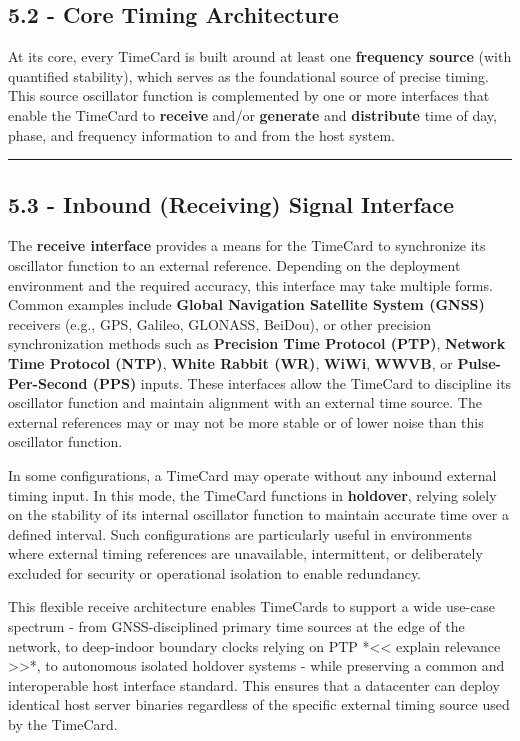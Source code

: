 \subsection{5.2 - Core Timing
Architecture}\label{core-timing-architecture}

At its core, every TimeCard is built around at least one
\textbf{frequency source} (with quantified stability), which serves as
the foundational source of precise timing. This source oscillator
function is complemented by one or more interfaces that enable the
TimeCard to \textbf{receive} and/or \textbf{generate} and
\textbf{distribute} time of day, phase, and frequency information to and
from the host system.

\begin{center}\rule{0.5\linewidth}{0.5pt}\end{center}

\subsection{5.3 - Inbound (Receiving) Signal
Interface}\label{inbound-receiving-signal-interface}

The \textbf{receive interface} provides a means for the TimeCard to
synchronize its oscillator function to an external reference. Depending
on the deployment environment and the required accuracy, this interface
may take multiple forms. Common examples include \textbf{Global
Navigation Satellite System (GNSS)} receivers (e.g., GPS, Galileo,
GLONASS, BeiDou), or other precision synchronization methods such as
\textbf{Precision Time Protocol (PTP)}, \textbf{Network Time Protocol
(NTP)}, \textbf{White Rabbit (WR)}, \textbf{WiWi}, \textbf{WWVB}, or
\textbf{Pulse-Per-Second (PPS)} inputs. These interfaces allow the
TimeCard to discipline its oscillator function and maintain alignment
with an external time source. The external references may or may not be
more stable or of lower noise than this oscillator function.

In some configurations, a TimeCard may operate without any inbound
external timing input. In this mode, the TimeCard functions in
\textbf{holdover}, relying solely on the stability of its internal
oscillator function to maintain accurate time over a defined interval.
Such configurations are particularly useful in environments where
external timing references are unavailable, intermittent, or
deliberately excluded for security or operational isolation to enable
redundancy.

This flexible receive architecture enables TimeCards to support a wide
use-case spectrum - from GNSS-disciplined primary time sources at the
edge of the network, to deep-indoor boundary clocks relying on PTP
*\textless\textless{} explain relevance \textgreater\textgreater**, to
autonomous isolated holdover systems - while preserving a common and
interoperable host interface standard. This ensures that a datacenter
can deploy identical host server binaries regardless of the specific
external timing source used by the TimeCard.

